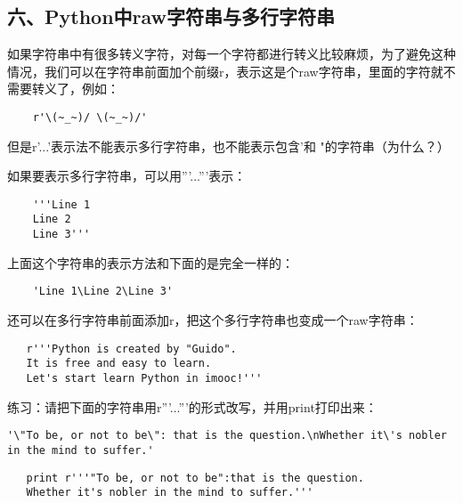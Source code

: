 \documentclass{article}
\begin{document}
\begin{CJK}{UTF8}{gbsn}
\part*{六、Python中raw字符串与多行字符串}
\subparagraph*{}
如果字符串中有很多转义字符，对每一个字符都进行转义比较麻烦，为了避免这种情况，我们可以在字符串前面加个前缀r，表示这是个raw字符串，里面的字符就不需要转义了，例如：
\begin{verbatim}
    r'\(~_~)/ \(~_~)/'
\end{verbatim}
\subparagraph*{}
但是r'...'表示法不能表示多行字符串，也不能表示包含'和 "的字符串（为什么？）
\subparagraph*{}
如果要表示多行字符串，可以用'''...'''表示：
\begin{verbatim}
    '''Line 1
    Line 2
    Line 3'''
\end{verbatim}
\subparagraph*{}
上面这个字符串的表示方法和下面的是完全一样的：
\begin{verbatim}
    'Line 1\Line 2\Line 3'
\end{verbatim}
\subparagraph*{}
还可以在多行字符串前面添加r，把这个多行字符串也变成一个raw字符串：
\begin{verbatim}
   r'''Python is created by "Guido".
   It is free and easy to learn.
   Let's start learn Python in imooc!''' 
\end{verbatim}
\subparagraph*{}
练习：请把下面的字符串用r'''...'''的形式改写，并用print打印出来：
\begin{verbatim}
'\"To be, or not to be\": that is the question.\nWhether it\'s nobler in the mind to suffer.'
\end{verbatim}
\begin{verbatim}
   print r'''"To be, or not to be":that is the question.
   Whether it's nobler in the mind to suffer.'''
\end{verbatim}

\end{CJK}
\end{document}
